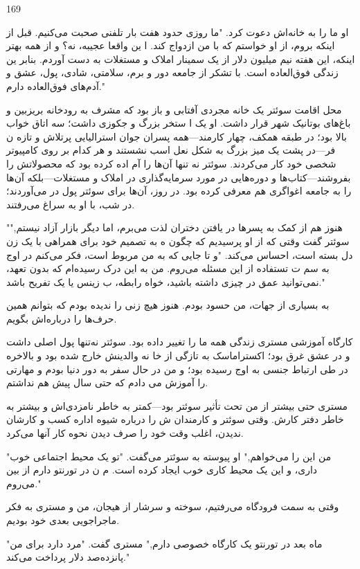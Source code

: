 169

او ما را به خانه‌اش دعوت کرد. "ما روزی حدود هفت بار تلفنی صحبت می‌کنیم. قبل از اینکه بروم، از او خواستم که با من ازدواج کند. ا
ین واقعا عجیبه، نه؟ و از همه بهتر اینکه، این هفته نیم میلیون دلار از یک سمینار املاک و مستغلات به دست آوردم. بنابر
ین زندگی فوق‌العاده است. با تشکر از جامعه دور و برم، سلامتی، شادی، پول، عشق و آدم‌های فوق‌العاده دارم."

محل اقامت سوئتر یک خانه مجردی آفتابی و باز بود که مشرف به رودخانه بریزبین و باغ‌های بوتانیک شهر قرار داشت. او یک ا
ستخر بزرگ و جکوزی داشت؛ سه اتاق خواب بالا بود؛ در طبقه همکف، چهار کارمند—همه پسران جوان استرالیایی پرتلاش و تازه ن
فر—در پشت یک میز بزرگ به شکل نعل اسب نشستند و هر کدام بر روی کامپیوتر شخصی خود کار می‌کردند. سوئتر نه تنها آن‌ها را آم
اده کرده بود که محصولاتش را بفروشند—کتاب‌ها و دوره‌هایی در مورد سرمایه‌گذاری در املاک و مستغلات—بلکه آن‌ها را به جامعه
اغواگری هم معرفی کرده بود. در روز، آن‌ها برای سوئتر پول در می‌آوردند؛ در شب، با او به سراغ می‌رفتند.

"هنوز هم از کمک به پسرها در یافتن دختران لذت می‌برم، اما دیگر بازار آزاد نیستم," سوئتر گفت وقتی که از او پرسیدیم که چگون
ه به تصمیم خود برای همراهی با یک زن دل بسته است، احساس می‌کند. "و تا جایی که به من مربوط است، فکر می‌کنم در اوج به سم
ت تستفاده از این مسئله می‌روم. من به این درک رسیده‌ام که بدون تعهد، نمی‌توانید عمق در چیزی داشته باشید، خواه رابطه، ب
زینس یا یک تفریح باشد."

به بسیاری از جهات، من حسود بودم. هنوز هیچ زنی را ندیده بودم که بتوانم همین حرف‌ها را درباره‌اش بگویم.

کارگاه آموزشی مستری زندگی همه ما را تغییر داده بود. سوئتر نه‌تنها پول اصلی داشت و در عشق غرق بود؛ اکستراماسک به تازگی از خا
نه والدینش خارج شده بود و بالاخره در طی ارتباط جنسی به اوج رسیده بود؛ و من در حال سفر به دور دنیا بودم و مهارتی را آموزش می‌
دادم که حتی سال پیش هم نداشتم.

مستری حتی بیشتر از من تحت تأثیر سوئتر بود—کمتر به خاطر نامزدی‌اش و بیشتر به خاطر دفتر کارش. وقتی سوئتر و کارمندان
ش را درباره شیوه اداره کسب و کارشان ندیدن، اغلب وقت خود را صرف دیدن نحوه کار آنها می‌کرد.

"من این را می‌خواهم," او پیوسته به سوئتر می‌گفت. "تو یک محیط اجتماعی خوب داری، و این یک محیط کاری خوب ایجاد کرده است. م
ن در تورنتو دارم از بین می‌روم."

وقتی به سمت فرودگاه می‌رفتیم، سوخته و سرشار از هیجان، من و مستری به فکر ماجراجویی بعدی خود بودیم.

"ماه بعد در تورنتو یک کارگاه خصوصی دارم," مستری گفت. "مرد دارد برای من پانزده‌صد دلار پرداخت می‌کند."